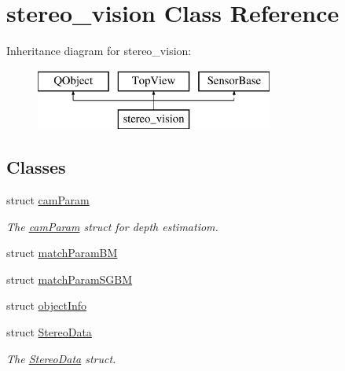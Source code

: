 \hypertarget{classstereo__vision}{}\section{stereo\+\_\+vision Class Reference}
\label{classstereo__vision}
Inheritance diagram for stereo\+\_\+vision\+:\begin{figure}[H]
\begin{center}
\leavevmode
\includegraphics[height=2.000000cm]{classstereo__vision}
\end{center}
\end{figure}
\subsection*{Classes}
\begin{DoxyCompactItemize}
\item 
struct \hyperlink{structstereo__vision_1_1cam_param}{cam\+Param}
\begin{DoxyCompactList}\small\item\em The \hyperlink{structstereo__vision_1_1cam_param}{cam\+Param} struct for depth estimatiom. \end{DoxyCompactList}\item 
struct \hyperlink{structstereo__vision_1_1match_param_b_m}{match\+Param\+B\+M}
\item 
struct \hyperlink{structstereo__vision_1_1match_param_s_g_b_m}{match\+Param\+S\+G\+B\+M}
\item 
struct \hyperlink{structstereo__vision_1_1object_info}{object\+Info}
\item 
struct \hyperlink{structstereo__vision_1_1_stereo_data}{Stereo\+Data}
\begin{DoxyCompactList}\small\item\em The \hyperlink{structstereo__vision_1_1_stereo_data}{Stereo\+Data} struct. \end{DoxyCompactList}\end{DoxyCompactItemize}

